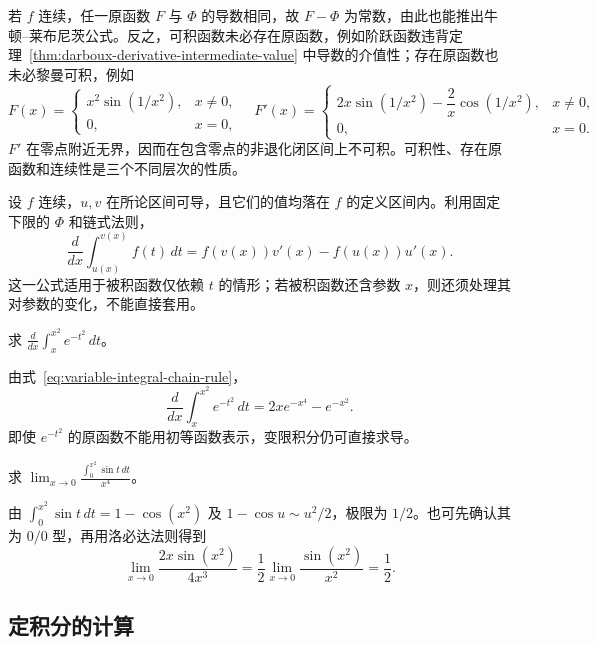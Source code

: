 若 $f$ 连续，任一原函数 $F$ 与 $\Phi$ 的导数相同，故 $F-\Phi$ 为常数，由此也能推出牛顿--莱布尼茨公式。反之，可积函数未必存在原函数，例如阶跃函数违背定理~\ref{thm:darboux-derivative-intermediate-value} 中导数的介值性；存在原函数也未必黎曼可积，例如
\[
    F(x)=
    \begin{cases}x^2\sin(1/x^2),&x\neq0,\\0,&x=0,\end{cases}
    \quad
    F'(x)=
    \begin{cases}2x\sin(1/x^2)-\dfrac2x\cos(1/x^2),&x\neq0,\\0,&x=0.\end{cases}
\]
$F'$ 在零点附近无界，因而在包含零点的非退化闭区间上不可积。可积性、存在原函数和连续性是三个不同层次的性质。

设 $f$ 连续，$u,v$ 在所论区间可导，且它们的值均落在 $f$ 的定义区间内。利用固定下限的 $\Phi$ 和链式法则，
\begin{equation}
    \frac{d}{dx}\int_{u(x)}^{v(x)}f(t)\,dt
    =f(v(x))v'(x)-f(u(x))u'(x).
    \label{eq:variable-integral-chain-rule}
\end{equation}
这一公式适用于被积函数仅依赖 $t$ 的情形；若被积函数还含参数 $x$，则还须处理其对参数的变化，不能直接套用。

\begin{example}
\label{ex:variable-gaussian-integral-derivative}
求 $\displaystyle\frac{d}{dx}\int_x^{x^2}e^{-t^2}\,dt$。
\end{example}
\begin{solve}
由式~\eqref{eq:variable-integral-chain-rule}，
\[
    \frac{d}{dx}\int_x^{x^2}e^{-t^2}\,dt
    =2xe^{-x^4}-e^{-x^2}.
\]
即使 $e^{-t^2}$ 的原函数不能用初等函数表示，变限积分仍可直接求导。
\end{solve}

\begin{example}
\label{ex:variable-integral-limit}
求 $\displaystyle\lim_{x\to0}\frac{\int_0^{x^2}\sin t\,dt}{x^4}$。
\end{example}
\begin{solve}
由 $\int_0^{x^2}\sin t\,dt=1-\cos(x^2)$ 及 $1-\cos u\sim u^2/2$，极限为 $1/2$。也可先确认其为 $0/0$ 型，再用洛必达法则得到
\[
    \lim_{x\to0}\frac{2x\sin(x^2)}{4x^3}
    =\frac12\lim_{x\to0}\frac{\sin(x^2)}{x^2}=\frac12.
\]
\end{solve}

\subsection{定积分的计算}
\label{subsec:evaluation-of-definite-integrals}

